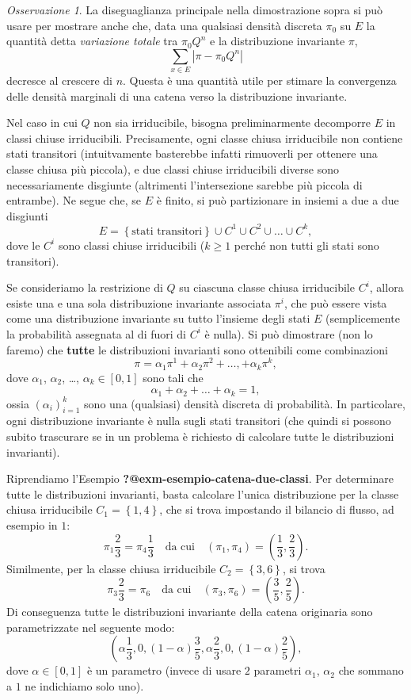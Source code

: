 \documentclass[
  italian,
  letterpaper,
]{book}
\newcommand{\cur}[1]{\left\{ #1 \right\}}
\theoremstyle{definition}
\theoremstyle{remark}
\newtheorem*{remark}{Osservazione}
\begin{document}
\begin{remark}
La diseguaglianza principale nella dimostrazione sopra si può usare per
mostrare anche che, data una qualsiasi densità discreta \(\pi_0\) su
\(E\) la quantità detta \emph{variazione totale} tra \(\pi_0 Q^n\) e la
distribuzione invariante \(\pi\), \[ \sum_{x\in E} | \pi - \pi_0 Q^n |\]
decresce al crescere di \(n\). Questa è una quantità utile per stimare
la convergenza delle densità marginali di una catena verso la
distribuzione invariante.
\end{remark}

Nel caso in cui \(Q\) non sia irriducibile, bisogna preliminarmente
decomporre \(E\) in classi chiuse irriducibili. Precisamente, ogni
classe chiusa irriducibile non contiene stati transitori (intuitvamente
basterebbe infatti rimuoverli per ottenere una classe chiusa più
piccola), e due classi chiuse irriducibili diverse sono necessariamente
disgiunte (altrimenti l'intersezione sarebbe più piccola di entrambe).
Ne segue che, se \(E\) è finito, si può partizionare in insiemi a due a
due disgiunti
\[ E = \cur{\text{stati transitori}} \cup C^1 \cup C^2 \cup \ldots \cup C^k,\]
dove le \(C^i\) sono classi chiuse irriducibili (\(k \ge 1\) perché non
tutti gli stati sono transitori).

Se consideriamo la restrizione di \(Q\) su ciascuna classe chiusa
irriducibile \(C^i\), allora esiste una e una sola distribuzione
invariante associata \(\pi^i\), che può essere vista come una
distribuzione invariante su tutto l'insieme degli stati \(E\)
(semplicemente la probabilità assegnata al di fuori di \(C^i\) è nulla).
Si può dimostrare (non lo faremo) che \textbf{tutte} le distribuzioni
invarianti sono ottenibili come combinazioni
\[ \pi = \alpha_1 \pi^1 + \alpha_2 \pi^2 + \ldots, + \alpha_k \pi^k,\]
dove \(\alpha_1\), \(\alpha_2\), \ldots, \(\alpha_k \in [0,1]\) sono
tali che \[\alpha_1+\alpha_2 +\ldots + \alpha_k = 1,\] ossia
\((\alpha_i)_{i=1}^k\) sono una (qualsiasi) densità discreta di
probabilità. In particolare, ogni distribuzione invariante è nulla sugli
stati transitori (che quindi si possono subito trascurare se in un
problema è richiesto di calcolare tutte le distribuzioni invarianti).

Riprendiamo l'Esempio \textbf{?@exm-esempio-catena-due-classi}. Per
determinare tutte le distribuzioni invarianti, basta calcolare l'unica
distribuzione per la classe chiusa irriducibile \(C_1 = \cur{1,4}\), che
si trova impostando il bilancio di flusso, ad esempio in \(1\):
\[ \pi_1 \frac 2 3 = \pi_4 \frac  1 3 \quad \text{da cui} \quad (\pi_1, \pi_4) = (\frac 1 3 , \frac 2 3 ).\]
Similmente, per la classe chiusa irriducibile \(C_2 = \cur{3,6}\), si
trova
\[ \pi_3 \frac 2 3 =  \pi_6 \quad \text{da cui} \quad (\pi_3, \pi_6) = (\frac 3 5, \frac 2 5).\]
Di conseguenza tutte le distribuzioni invariante della catena originaria
sono parametrizzate nel seguente modo:
\[ (\alpha \frac 1 3, 0, (1-\alpha) \frac 3 5, \alpha \frac 2 3, 0, (1-\alpha)\frac 2 5 ),\]
dove \(\alpha \in [0,1]\) è un parametro (invece di usare \(2\)
parametri \(\alpha_1\), \(\alpha_2\) che sommano a \(1\) ne indichiamo
solo uno).
\end{document}
